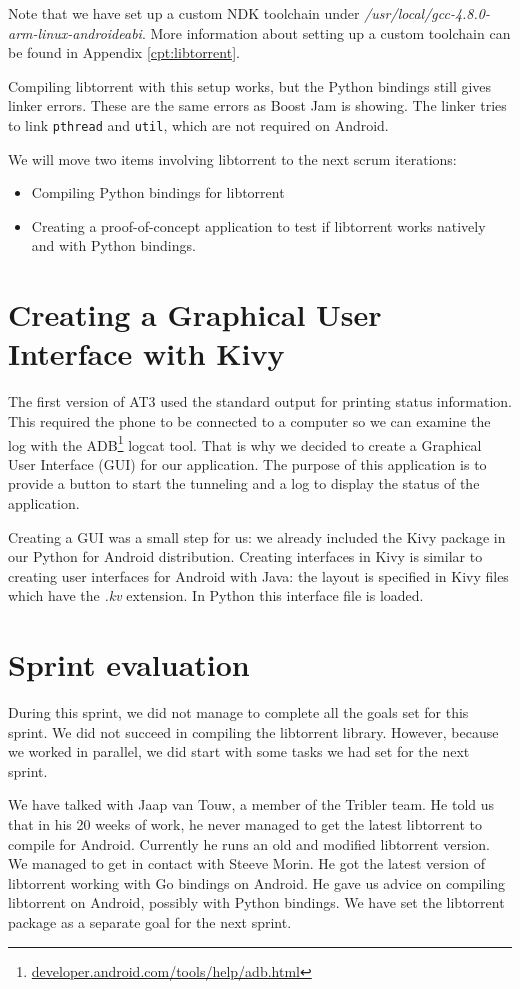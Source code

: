 		Note that we have set up a custom NDK toolchain under \emph{/usr/local/gcc-4.8.0-arm-linux-androideabi}. More information about setting up a custom toolchain can be found in Appendix \ref{cpt:libtorrent}.
		
		Compiling libtorrent with this setup works, but the Python bindings still gives linker errors. These are the same errors as Boost Jam is showing. The linker tries to link \texttt{pthread} and \texttt{util}, which are not required on Android.
		
		We will move two items involving libtorrent to the next scrum iterations:
		\begin{itemize}
		\item Compiling Python bindings for libtorrent
		\item Creating a proof-of-concept application to test if libtorrent works natively and with Python bindings.
		\end{itemize}
	
	\section{Creating a Graphical User Interface with Kivy}
		The first version of AT3 used the standard output for printing status information. This required the phone to be connected to a computer so we can examine the log with the ADB\footnote{\href{http://developer.android.com/tools/help/adb.html}{developer.android.com/tools/help/adb.html}} logcat tool. That is why we decided to create a Graphical User Interface (GUI) for our application. The purpose of this application is to provide a button to start the tunneling and a log to display the status of the application.
	
		Creating a GUI was a small step for us: we already included the Kivy package in our Python for Android distribution. Creating interfaces in Kivy is similar to creating user interfaces for Android with Java: the layout is specified in Kivy files which have the \emph{.kv} extension. In Python this interface file is loaded.
	
	\section{Sprint evaluation}
		During this sprint, we did not manage to complete all the goals set for this sprint. We did not succeed in compiling the libtorrent library. However, because we worked in parallel, we did start with some tasks we had set for the next sprint.
		
		We have talked with Jaap van Touw, a member of the Tribler team. He told us that in his 20 weeks of work, he never managed to get the latest libtorrent to compile for Android.
		Currently he runs an old and modified libtorrent version. We managed to get in contact with Steeve Morin. He got the latest version of libtorrent working with Go bindings on Android. He gave us advice on compiling libtorrent on Android, possibly with Python bindings. We have set the libtorrent package as a separate goal for the next sprint.
